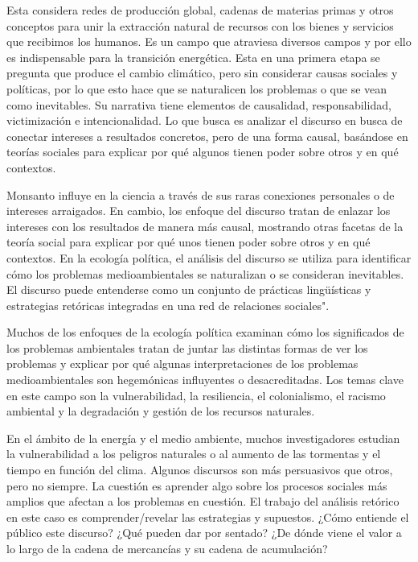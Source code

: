 \documentclass{article}
\begin{document}
Esta considera redes de producción global, cadenas de materias primas y otros conceptos para unir la extracción natural de recursos con los bienes y servicios que recibimos los humanos. Es un campo que atraviesa diversos campos y por ello es indispensable para la transición energética. Esta en una primera etapa se pregunta que produce el cambio climático, pero sin considerar causas sociales y políticas, por lo que esto hace que se naturalicen los problemas o que se vean como inevitables. Su narrativa tiene elementos de causalidad, responsabilidad, victimización e intencionalidad. Lo que busca es analizar el discurso en busca de conectar intereses a resultados concretos, pero de una forma causal, basándose en teorías sociales para explicar por qué algunos tienen poder sobre otros y en qué contextos.

Monsanto influye en la ciencia  a través de sus raras conexiones personales o de intereses arraigados. En cambio, los enfoque del discurso tratan de enlazar los intereses con los resultados de manera más causal, mostrando otras facetas de la teoría social para explicar por qué unos tienen poder sobre otros y en qué contextos.
En la ecología política, el análisis del discurso se utiliza para identificar cómo los problemas medioambientales se naturalizan o se consideran inevitables. El discurso puede entenderse como un conjunto de prácticas lingüísticas y estrategias retóricas integradas en una red de relaciones sociales". 


Muchos de los enfoques de la ecología política examinan cómo los significados de los problemas ambientales tratan de juntar las distintas formas de ver los problemas y explicar por qué algunas interpretaciones de los problemas medioambientales son hegemónicas influyentes o desacreditadas. Los temas clave en este campo son la vulnerabilidad, la resiliencia, el colonialismo, el racismo ambiental y la degradación y gestión de los recursos naturales.


En el ámbito de la energía y el medio ambiente, muchos investigadores estudian la vulnerabilidad a los peligros naturales o al aumento de las tormentas y el tiempo en función del clima. 
Algunos discursos son más persuasivos que otros, pero no siempre. La cuestión es aprender algo sobre los procesos sociales más amplios que afectan a los problemas en cuestión. El trabajo del análisis retórico en este caso es comprender/revelar las estrategias y supuestos. ¿Cómo entiende el público este discurso? ¿Qué pueden dar por sentado?
¿De dónde viene el valor a lo largo de la cadena de mercancías y su cadena de acumulación?
\end{document}
